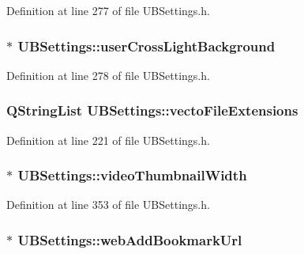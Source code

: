 Definition at line 277 of file U\-B\-Settings.\-h.

\hypertarget{class_u_b_settings_abb0809c7edab4cf15754a6d185f1fd06}{
\subsubsection[{user\-Cross\-Light\-Background}]{$\ast$ U\-B\-Settings\-::user\-Cross\-Light\-Background}}\label{db/d66/class_u_b_settings_abb0809c7edab4cf15754a6d185f1fd06}


Definition at line 278 of file U\-B\-Settings.\-h.

\hypertarget{class_u_b_settings_a50ffb20fab9f7e6d499f0191cadf6f79}{
\subsubsection[{vecto\-File\-Extensions}]{\setlength{\rightskip}{0pt plus 5cm}Q\-String\-List U\-B\-Settings\-::vecto\-File\-Extensions\hspace{0.3cm}{\ttfamily [static]}}}\label{db/d66/class_u_b_settings_a50ffb20fab9f7e6d499f0191cadf6f79}


Definition at line 221 of file U\-B\-Settings.\-h.

\hypertarget{class_u_b_settings_afbbe4e4356efe6c65b2b9495d5afeb80}{
\subsubsection[{video\-Thumbnail\-Width}]{$\ast$ U\-B\-Settings\-::video\-Thumbnail\-Width}}\label{db/d66/class_u_b_settings_afbbe4e4356efe6c65b2b9495d5afeb80}


Definition at line 353 of file U\-B\-Settings.\-h.

\hypertarget{class_u_b_settings_aa3b76ba241083298570f0aa7891cd1f3}{
\subsubsection[{web\-Add\-Bookmark\-Url}]{$\ast$ U\-B\-Settings\-::web\-Add\-Bookmark\-Url}}\label{db/d66/class_u_b_settings_aa3b76ba241083298570f0aa7891cd1f3}


